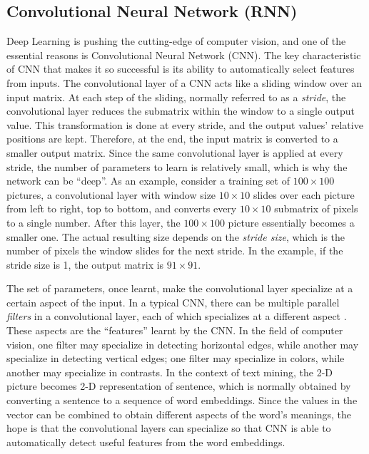 \subsection{Convolutional Neural Network (RNN)}

Deep Learning is pushing the cutting-edge of computer vision, and one of the essential reasons is Convolutional Neural Network (CNN). The key characteristic of CNN that makes it so successful is its ability to automatically select features from inputs. The convolutional layer of a CNN acts like a sliding window over an input matrix. At each step of the sliding, normally referred to as a {\em stride}, the convolutional layer reduces the submatrix within the window to a single output value. This transformation is done at every stride, and the output values' relative positions are kept. Therefore, at the end, the input matrix is converted to a smaller output matrix. Since the same convolutional layer is applied at every stride, the number of parameters to learn is relatively small, which is why the network can be ``deep''. As an example, consider a training set of $100 \times 100$ pictures, a convolutional layer with window size $10 \times 10$ slides over each picture from left to right, top to bottom, and converts every $10 \times 10$ submatrix of pixels to a single number. After this layer, the $100 \times 100$ picture essentially becomes a smaller one. The actual resulting size depends on the {\em stride size}, which is the number of pixels the window slides for the next stride. In the example, if the stride size is 1, the output matrix is $91 \times 91$.

The set of parameters, once learnt, make the convolutional layer specialize at a certain aspect of the input. In a typical CNN, there can be multiple parallel {\em filters} in a convolutional layer, each of which specializes at a different aspect \cite{krizhevsky2012}. These aspects are the ``features'' learnt by the CNN. In the field of computer vision, one filter may specialize in detecting horizontal edges, while another may specialize in detecting vertical edges; one filter may specialize in colors, while another may specialize in contrasts. In the context of text mining, the 2-D picture becomes 2-D representation of sentence, which is normally obtained by converting a sentence to a sequence of word embeddings. Since the values in the vector can be combined to obtain different aspects of the word's meanings, the hope is that the convolutional layers can specialize so that CNN is able to automatically detect useful features from the word embeddings. 

